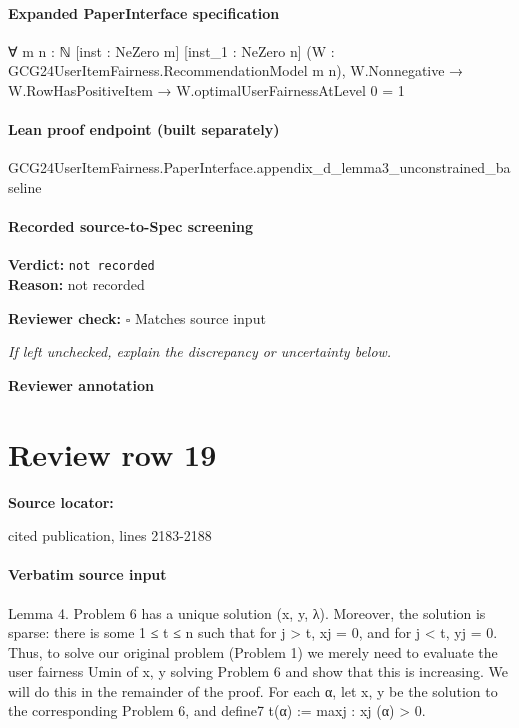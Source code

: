 \documentclass[10pt]{article}
\newcommand{\reviewerbox}{%
  \par\noindent\fbox{\parbox{0.96\linewidth}{\rule{0pt}{0.38in}}}\par
}
\newcommand{\reviewmatch}[1]{%
  \par\noindent\textbf{Reviewer check:} $\square$\; #1\par
  \noindent\emph{If left unchecked, explain the discrepancy or uncertainty below.}\par
}
\begin{document}
\paragraph{Expanded PaperInterface specification}
\begin{ReviewVerbatim}
∀ {m n : ℕ} [inst : NeZero m] [inst_1 : NeZero n] (W : GCG24UserItemFairness.RecommendationModel m n),
  W.Nonnegative → W.RowHasPositiveItem → W.optimalUserFairnessAtLevel 0 = 1
\end{ReviewVerbatim}

\paragraph{Lean proof endpoint (built separately)}\begin{ReviewVerbatim}
GCG24UserItemFairness.PaperInterface.appendix_d_lemma3_unconstrained_baseline
\end{ReviewVerbatim}

\paragraph{Recorded source-to-Spec screening}
\textbf{Verdict:} \texttt{not recorded}
\\
\textbf{Reason:} not recorded
\reviewmatch{Matches source input}
\noindent\textbf{Reviewer annotation}\par
\reviewerbox
\clearpage
\hypertarget{source-claim-bdf6b6ab56cd5fdc}{}
\section*{Review row 19}
\textbf{Source locator:} {\footnotesize\raggedright cited publication, lines 2183-\allowbreak{}2188\par}
\paragraph{Verbatim source input}
\begin{ReviewVerbatim}
Lemma 4. Problem 6 has a unique solution (x, y, λ). Moreover, the solution is sparse: there is some
1 ≤ t ≤ n such that for j > t, xj = 0, and for j < t, yj = 0.
Thus, to solve our original problem (Problem 1) we merely need to evaluate the user fairness Umin of
x, y solving Problem 6 and show that this is increasing. We will do this in the remainder of the proof.
For each α, let x, y be the solution to the corresponding Problem 6, and define7
t(α) := max{j : xj (α) > 0}.
\end{ReviewVerbatim}
\end{document}
